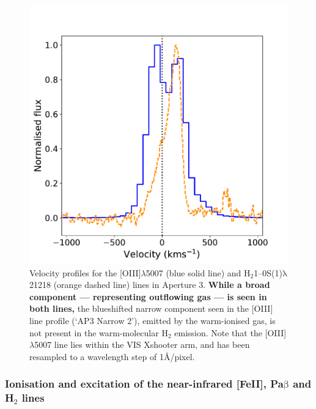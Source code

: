 \begin{figure}[!ht]
	\centering
	\includegraphics[width=0.7\linewidth]{figures/xshooter_ic5063/ap3_oiii_h2.pdf}
	\caption[Velocity profiles of for the {[}OIII{]}$\lambda$5007 and H$_2$1--0S(1)$\mathrm{\lambda}$21218 lines at the position of the SE radio lobe of IC.]{Velocity profiles for the [OIII]$\lambda$5007 (blue solid line) and \mbox{H$_2$1--0S(1)$\mathrm{\lambda}$21218} (orange dashed line) lines in Aperture 3. \textbf{While a broad component --- representing outflowing gas --- is seen in both lines,} the blueshifted narrow component seen in the [OIII] line profile (`AP3 Narrow 2'), emitted by the warm-ionised gas, is not present in the warm-molecular H$_2$ emission. Note that the [OIII]$\lambda$5007 line lies within the VIS Xshooter arm, and has been resampled to a wavelength step of 1\AA/pixel.}
	\label{fig: xshooter_ic5063: ap3_oiii_h2}
\end{figure}

\subsubsection{Ionisation and excitation of the near-infrared [FeII], Pa$\mathrm{\beta}$ and H$_2$ lines}
\label{section: xshooter_ic5063: properties_of_outflowing_gas: nir_analysis_and_results: excitation}

